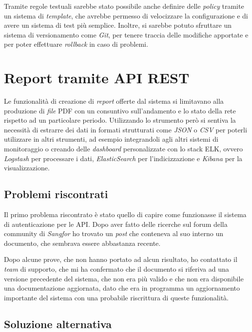 Tramite regole testuali sarebbe stato possibile anche definire delle \emph{policy} tramite un sistema di \emph{template}, che avrebbe permesso di velocizzare la configurazione e di avere un sistema di test più semplice. Inoltre, si sarebbe potuto sfruttare un sistema di versionamento come \emph{Git}, per tenere traccia delle modifiche apportate e per poter effettuare \emph{rollback} in caso di problemi.

\section{Report tramite API REST}

Le funzionalità di creazione di \emph{report} offerte dal sistema si limitavano alla produzione di \emph{file} PDF con un consuntivo sull'andamento e lo stato della rete rispetto ad un particolare periodo. Utilizzando lo strumento però si sentiva la necessità di estrarre dei dati in formati strutturati come \emph{JSON} o \emph{CSV} per poterli utilizzare in altri strumenti, ad esempio integrandoli agli altri sistemi di monitoraggio o creando delle \emph{dashboard} personalizzate con lo stack ELK, ovvero \emph{Logstash} per processare i dati, \emph{ElasticSearch} per l'indicizzazione e \emph{Kibana} per la visualizzazione.

\subsection{Problemi riscontrati}

Il primo problema riscontrato è stato quello di capire come funzionasse il sistema di autenticazione per le API. Dopo aver fatto delle ricerche sul forum della community\cite{forum:sangfor-community} di \emph{Sangfor} ho trovato un \emph{post} che conteneva al suo interno un documento\cite{sangfor:rest-api}, che sembrava essere abbastanza recente. 

Dopo alcune prove, che non hanno portato ad alcun risultato, ho contattato il \emph{team} di supporto, che mi ha confermato che il documento si riferiva ad una versione precedente del sistema, che non era più valido e che non era disponibile una documentazione aggiornata, dato che era in programma un aggiornamento importante del sistema con una probabile riscrittura di queste funzionalità. 

\subsection{Soluzione alternativa}

